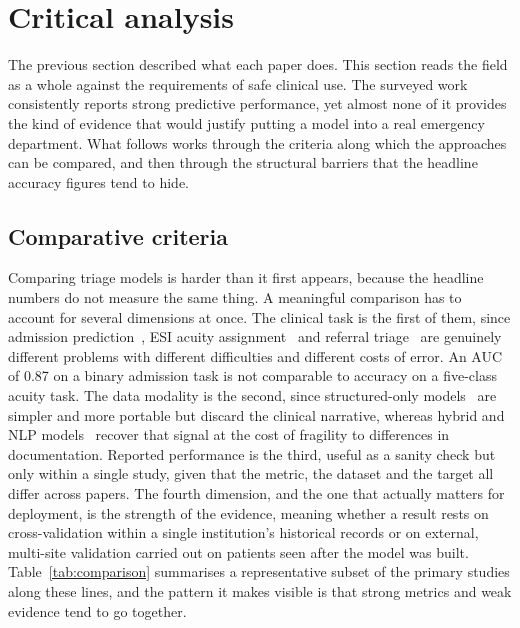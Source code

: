 \documentclass[11pt]{article}
\begin{document}
\section{Critical analysis}
\label{sec:critical}

The previous section described what each paper does. This section reads the field as a whole against the requirements of safe clinical use. The surveyed work consistently reports strong predictive performance, yet almost none of it provides the kind of evidence that would justify putting a model into a real emergency department. What follows works through the criteria along which the approaches can be compared, and then through the structural barriers that the headline accuracy figures tend to hide.

\subsection{Comparative criteria}

Comparing triage models is harder than it first appears, because the headline numbers do not measure the same thing. A meaningful comparison has to account for several dimensions at once. The clinical task is the first of them, since admission prediction~\cite{Hong2018PredictingHA, Yoshimura2026}, ESI acuity assignment~\cite{Vantu2023, Ivanov2021} and referral triage~\cite{Wang2023} are genuinely different problems with different difficulties and different costs of error. An AUC of 0.87 on a binary admission task is not comparable to accuracy on a five-class acuity task. The data modality is the second, since structured-only models~\cite{Hong2018PredictingHA, Vantu2023, Yoshimura2026} are simpler and more portable but discard the clinical narrative, whereas hybrid and NLP models~\cite{Wang2023, Ivanov2021} recover that signal at the cost of fragility to differences in documentation. Reported performance is the third, useful as a sanity check but only within a single study, given that the metric, the dataset and the target all differ across papers. The fourth dimension, and the one that actually matters for deployment, is the strength of the evidence, meaning whether a result rests on cross-validation within a single institution's historical records or on external, multi-site validation carried out on patients seen after the model was built. Table~\ref{tab:comparison} summarises a representative subset of the primary studies along these lines, and the pattern it makes visible is that strong metrics and weak evidence tend to go together.
\end{document}
